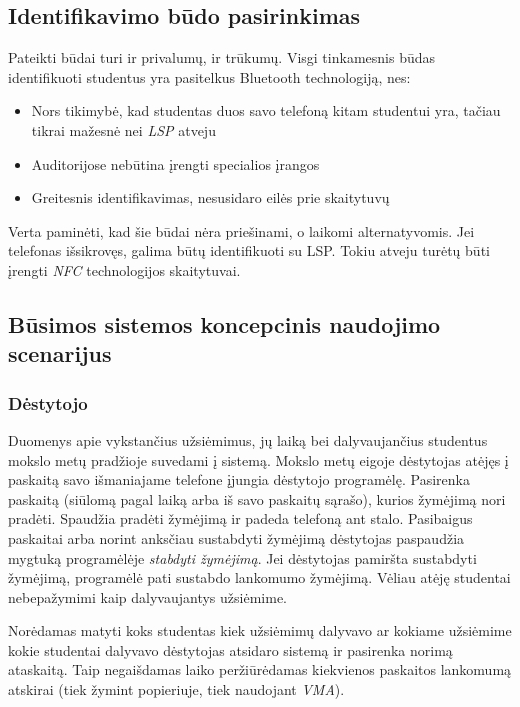 \documentclass{VUMIFPSbakalaurinis}
\begin{document}
\subsection{Identifikavimo būdo pasirinkimas}

Pateikti būdai turi ir privalumų, ir trūkumų. Visgi tinkamesnis būdas identifikuoti studentus yra pasitelkus Bluetooth technologiją, nes:

\begin{itemize}
    \item Nors tikimybė, kad studentas duos savo telefoną kitam studentui yra, tačiau tikrai mažesnė nei \textit{LSP} atveju
	\item Auditorijose nebūtina įrengti specialios įrangos
	\item Greitesnis identifikavimas, nesusidaro eilės prie skaitytuvų
\end{itemize}

Verta paminėti, kad šie būdai nėra priešinami, o laikomi alternatyvomis. Jei telefonas išsikrovęs, galima būtų identifikuoti su LSP. Tokiu atveju turėtų būti įrengti \textit{NFC} technologijos skaitytuvai.

\subsection{Būsimos sistemos koncepcinis naudojimo scenarijus}

\subsubsection{Dėstytojo}

Duomenys apie vykstančius užsiėmimus, jų laiką bei dalyvaujančius studentus mokslo metų pradžioje suvedami į sistemą. Mokslo metų eigoje dėstytojas atėjęs į paskaitą savo išmaniajame telefone įjungia dėstytojo programėlę. Pasirenka paskaitą (siūlomą pagal laiką arba iš savo paskaitų sąrašo), kurios žymėjimą nori pradėti. Spaudžia pradėti žymėjimą ir padeda telefoną ant stalo. Pasibaigus paskaitai arba norint anksčiau sustabdyti žymėjimą dėstytojas paspaudžia mygtuką programėlėje \textit{stabdyti žymėjimą}. Jei dėstytojas pamiršta sustabdyti žymėjimą, programėlė pati sustabdo lankomumo žymėjimą. Vėliau atėję studentai nebepažymimi kaip dalyvaujantys užsiėmime.

Norėdamas matyti koks studentas kiek užsiėmimų dalyvavo ar kokiame užsiėmime kokie studentai dalyvavo dėstytojas atsidaro sistemą ir pasirenka norimą ataskaitą. Taip negaišdamas laiko peržiūrėdamas kiekvienos paskaitos lankomumą atskirai (tiek žymint popieriuje, tiek naudojant \textit{VMA}).
\end{document}
